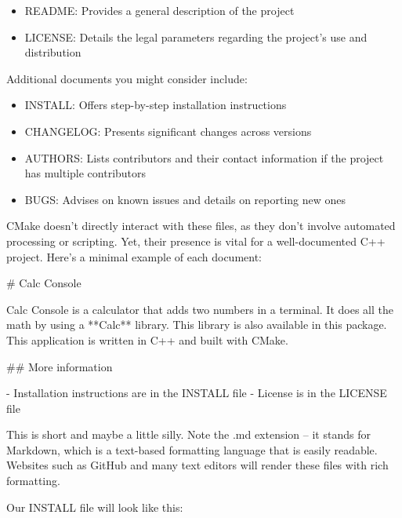 \begin{itemize}
\item
README: Provides a general description of the project

\item
LICENSE: Details the legal parameters regarding the project’s use and distribution
\end{itemize}

Additional documents you might consider include:

\begin{itemize}
\item
INSTALL: Offers step-by-step installation instructions

\item
CHANGELOG: Presents significant changes across versions

\item
AUTHORS: Lists contributors and their contact information if the project has multiple contributors

\item
BUGS: Advises on known issues and details on reporting new ones
\end{itemize}

CMake doesn’t directly interact with these files, as they don’t involve automated processing or scripting. Yet, their presence is vital for a well-documented C++ project. Here’s a minimal example of each document:


\begin{shell}
# Calc Console

Calc Console is a calculator that adds two numbers in a
terminal. It does all the math by using a **Calc** library.
This library is also available in this package.
This application is written in C++ and built with CMake.

## More information

- Installation instructions are in the INSTALL file
- License is in the LICENSE file
\end{shell}

This is short and maybe a little silly. Note the .md extension – it stands for Markdown, which is a text-based formatting language that is easily readable. Websites such as GitHub and many text editors will render these files with rich formatting.

Our INSTALL file will look like this:


